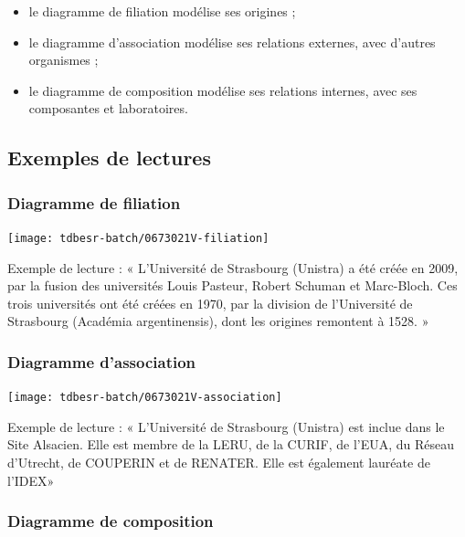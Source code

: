 \documentclass[12pt,french,landscape]{article}
\providecommand{\tightlist}{%
  \setlength{\itemsep}{0pt}\setlength{\parskip}{0pt}}
\begin{document}
\begin{multicols}{2}
\begin{itemize}
\tightlist
\item
  le diagramme de filiation modélise ses origines ;
\item
  le diagramme d'association modélise ses relations externes, avec
  d'autres organismes ;
\item
  le diagramme de composition modélise ses relations internes, avec ses
  composantes et laboratoires.
\end{itemize}

\hypertarget{exemples-de-lectures}{%
\subsection{Exemples de lectures}\label{exemples-de-lectures}}

\hypertarget{diagramme-de-filiation}{%
\subsubsection{Diagramme de filiation}\label{diagramme-de-filiation}}

\begin{center}\texttt{[image: tdbesr-batch/0673021V-filiation]} \end{center}

Exemple de lecture : « L'Université de Strasbourg (Unistra) a été créée
en 2009, par la fusion des universités Louis Pasteur, Robert Schuman et
Marc-Bloch. Ces trois universités ont été créées en 1970, par la
division de l'Université de Strasbourg (Académia argentinensis), dont
les origines remontent à 1528. »

\hypertarget{diagramme-dassociation}{%
\subsubsection{Diagramme d'association}\label{diagramme-dassociation}}

\begin{center}\texttt{[image: tdbesr-batch/0673021V-association]} \end{center}

Exemple de lecture : « L'Université de Strasbourg (Unistra) est inclue
dans le Site Alsacien. Elle est membre de la LERU, de la CURIF, de
l'EUA, du Réseau d'Utrecht, de COUPERIN et de RENATER. Elle est
également lauréate de l'IDEX»

\hypertarget{diagramme-de-composition}{%
\subsubsection{Diagramme de
composition}\label{diagramme-de-composition}}


\end{multicols}
\end{document}

